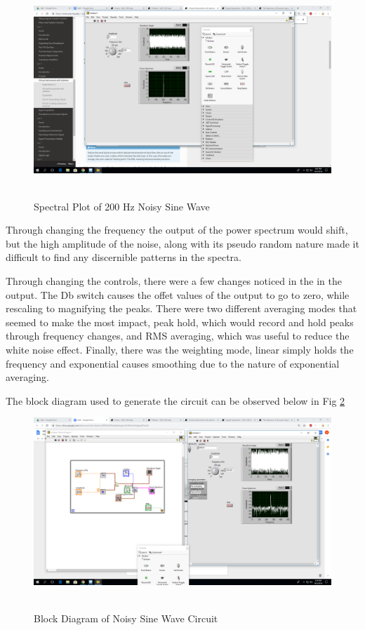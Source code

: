 \documentclass[10pt]{article}
\begin{document}
\begin{centering}
	\begin{figure} [H]
		\centering
		\includegraphics[scale=0.22]{images/200hzbasicspectralplot.png}\
		\caption{Spectral Plot of 200 Hz Noisy Sine Wave}
		\label{fig:200hznoisy}
	\end{figure}
\end{centering}

Through changing the frequency the output of the power spectrum would shift, but the high amplitude of the noise, along with its pseudo random nature made it difficult to find any discernible patterns in the spectra.

Through changing the controls, there were a few changes noticed in the in the output. The Db switch causes the offet values of the output to go to zero, while rescaling to magnifying the peaks. There were two different averaging modes that seemed to make the most impact, peak hold, which would record and hold peaks through frequency changes, and RMS averaging, which was useful to reduce the white noise effect. Finally, there was the weighting mode, linear simply holds the frequency and exponential causes smoothing due to the nature of exponential averaging.

The block diagram used to generate the circuit can be observed below in Fig \ref{fig:51block}
\begin{centering}
	\begin{figure} [H]
		\centering
		\includegraphics[scale=0.22]{images/51blockdiagram.png}\
		\caption{Block Diagram of Noisy Sine Wave Circuit}
		\label{fig:51block}
	\end{figure}
\end{centering}
\end{document}
